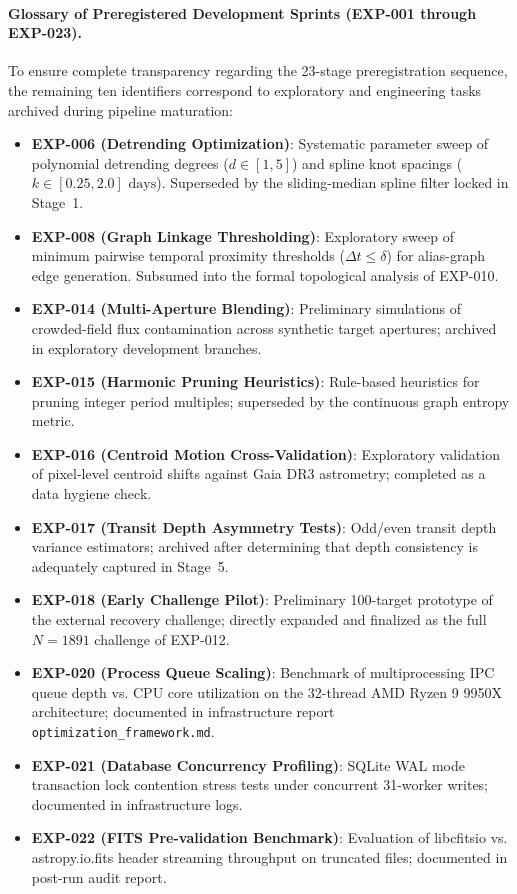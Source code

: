 \paragraph{Glossary of Preregistered Development Sprints (EXP-001 through EXP-023).}
To ensure complete transparency regarding the 23-stage preregistration sequence, the remaining ten identifiers correspond to exploratory and engineering tasks archived during pipeline maturation:
\begin{itemize}
    \item \textbf{EXP-006 (Detrending Optimization)}: Systematic parameter sweep of polynomial detrending degrees ($d \in [1, 5]$) and spline knot spacings ($k \in [0.25, 2.0]\text{ days}$). Superseded by the sliding-median spline filter locked in Stage~1.
    \item \textbf{EXP-008 (Graph Linkage Thresholding)}: Exploratory sweep of minimum pairwise temporal proximity thresholds ($\Delta t \le \delta$) for alias-graph edge generation. Subsumed into the formal topological analysis of EXP-010.
    \item \textbf{EXP-014 (Multi-Aperture Blending)}: Preliminary simulations of crowded-field flux contamination across synthetic target apertures; archived in exploratory development branches.
    \item \textbf{EXP-015 (Harmonic Pruning Heuristics)}: Rule-based heuristics for pruning integer period multiples; superseded by the continuous graph entropy metric.
    \item \textbf{EXP-016 (Centroid Motion Cross-Validation)}: Exploratory validation of pixel-level centroid shifts against Gaia DR3 astrometry; completed as a data hygiene check.
    \item \textbf{EXP-017 (Transit Depth Asymmetry Tests)}: Odd/even transit depth variance estimators; archived after determining that depth consistency is adequately captured in Stage~5.
    \item \textbf{EXP-018 (Early Challenge Pilot)}: Preliminary 100-target prototype of the external recovery challenge; directly expanded and finalized as the full $N=1891$ challenge of EXP-012.
    \item \textbf{EXP-020 (Process Queue Scaling)}: Benchmark of multiprocessing IPC queue depth vs. CPU core utilization on the 32-thread AMD Ryzen 9 9950X architecture; documented in infrastructure report \texttt{optimization\_framework.md}.
    \item \textbf{EXP-021 (Database Concurrency Profiling)}: SQLite WAL mode transaction lock contention stress tests under concurrent 31-worker writes; documented in infrastructure logs.
    \item \textbf{EXP-022 (FITS Pre-validation Benchmark)}: Evaluation of libcfitsio vs. astropy.io.fits header streaming throughput on truncated files; documented in post-run audit report.
\end{itemize}

